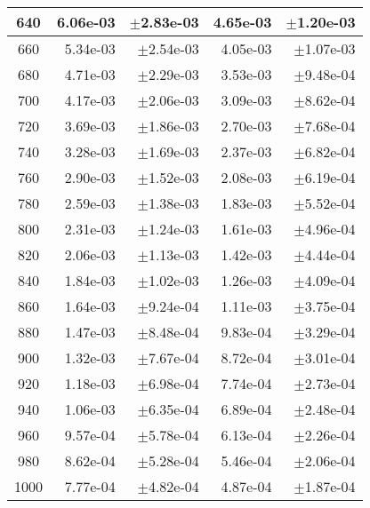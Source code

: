 \begin{tabular}{|c|r|r|r|r|}
640 & 6.06e-03 & $\pm$2.83e-03 & 4.65e-03 & $\pm$1.20e-03 \\
\hline
660 & 5.34e-03 & $\pm$2.54e-03 & 4.05e-03 & $\pm$1.07e-03 \\
\hline
680 & 4.71e-03 & $\pm$2.29e-03 & 3.53e-03 & $\pm$9.48e-04 \\
\hline
700 & 4.17e-03 & $\pm$2.06e-03 & 3.09e-03 & $\pm$8.62e-04 \\
\hline
720 & 3.69e-03 & $\pm$1.86e-03 & 2.70e-03 & $\pm$7.68e-04 \\
\hline
740 & 3.28e-03 & $\pm$1.69e-03 & 2.37e-03 & $\pm$6.82e-04 \\
\hline
760 & 2.90e-03 & $\pm$1.52e-03 & 2.08e-03 & $\pm$6.19e-04 \\
\hline
780 & 2.59e-03 & $\pm$1.38e-03 & 1.83e-03 & $\pm$5.52e-04 \\
\hline
800 & 2.31e-03 & $\pm$1.24e-03 & 1.61e-03 & $\pm$4.96e-04 \\
\hline
820 & 2.06e-03 & $\pm$1.13e-03 & 1.42e-03 & $\pm$4.44e-04 \\
\hline
840 & 1.84e-03 & $\pm$1.02e-03 & 1.26e-03 & $\pm$4.09e-04 \\
\hline
860 & 1.64e-03 & $\pm$9.24e-04 & 1.11e-03 & $\pm$3.75e-04 \\
\hline
880 & 1.47e-03 & $\pm$8.48e-04 & 9.83e-04 & $\pm$3.29e-04 \\
\hline
900 & 1.32e-03 & $\pm$7.67e-04 & 8.72e-04 & $\pm$3.01e-04 \\
\hline
920 & 1.18e-03 & $\pm$6.98e-04 & 7.74e-04 & $\pm$2.73e-04 \\
\hline
940 & 1.06e-03 & $\pm$6.35e-04 & 6.89e-04 & $\pm$2.48e-04 \\
\hline
960 & 9.57e-04 & $\pm$5.78e-04 & 6.13e-04 & $\pm$2.26e-04 \\
\hline
980 & 8.62e-04 & $\pm$5.28e-04 & 5.46e-04 & $\pm$2.06e-04 \\
\hline
1000 & 7.77e-04 & $\pm$4.82e-04 & 4.87e-04 & $\pm$1.87e-04 \\
\hline
\end{tabular}
